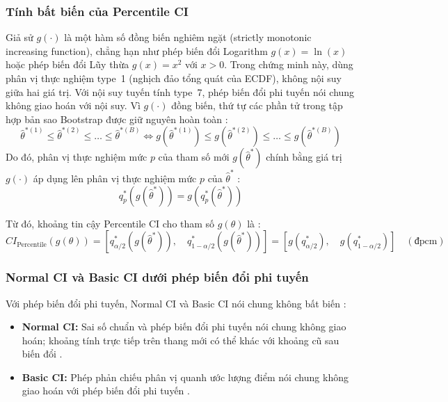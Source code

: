 		\subsubsection{Tính bất biến của Percentile CI}
		Giả sử $g(\cdot)$ là một hàm số đồng biến nghiêm ngặt (strictly monotonic increasing function), chẳng hạn như phép biến đổi Logarithm $g(x) = \ln(x)$ hoặc phép biến đổi Lũy thừa $g(x) = x^2$ với $x > 0$.
		Trong chứng minh này, dùng phân vị thực nghiệm type~1 (nghịch đảo tổng quát của ECDF), không nội suy giữa hai giá trị. Với nội suy tuyến tính type~7, phép biến đổi phi tuyến nói chung không giao hoán với nội suy. Vì $g(\cdot)$ đồng biến, thứ tự các phần tử trong tập hợp bản sao Bootstrap được giữ nguyên hoàn toàn \cite{efron1993}:
		\begin{equation}
			\hat{\theta}^{*(1)} \le \hat{\theta}^{*(2)} \le \dots \le \hat{\theta}^{*(B)} \iff g(\hat{\theta}^{*(1)}) \le g(\hat{\theta}^{*(2)}) \le \dots \le g(\hat{\theta}^{*(B)})
		\end{equation}
		Do đó, phân vị thực nghiệm mức $p$ của tham số mới $g(\hat{\theta}^*)$ chính bằng giá trị $g(\cdot)$ áp dụng lên phân vị thực nghiệm mức $p$ của $\hat{\theta}^*$ \cite{efron1993}:
		\begin{equation}
			q_p^*\left(g(\hat{\theta}^*)\right) = g\left(q_p^*(\hat{\theta}^*)\right)
		\end{equation}
		
		Từ đó, khoảng tin cậy Percentile CI cho tham số $g(\theta)$ là \cite{efron1993}:
		\begin{equation}
			CI_{\text{Percentile}}(g(\theta)) = \left[ q_{\alpha/2}^*(g(\hat{\theta}^*)), \quad q_{1-\alpha/2}^*(g(\hat{\theta}^*)) \right] = \left[ g(q_{\alpha/2}^*), \quad g(q_{1-\alpha/2}^*) \right] \quad (\text{đpcm})
		\end{equation}
		
		\subsubsection{Normal CI và Basic CI dưới phép biến đổi phi tuyến}
		Với phép biến đổi phi tuyến, Normal CI và Basic CI nói chung không bất biến \cite{efron1993, davison1997}:
		\begin{itemize}
			\item \textbf{Normal CI:} Sai số chuẩn và phép biến đổi phi tuyến nói chung không giao hoán; khoảng tính trực tiếp trên thang mới có thể khác với khoảng cũ sau biến đổi \cite{efron1993}.
			\item \textbf{Basic CI:} Phép phản chiếu phân vị quanh ước lượng điểm nói chung không giao hoán với phép biến đổi phi tuyến \cite{davison1997}.
		\end{itemize}
		
